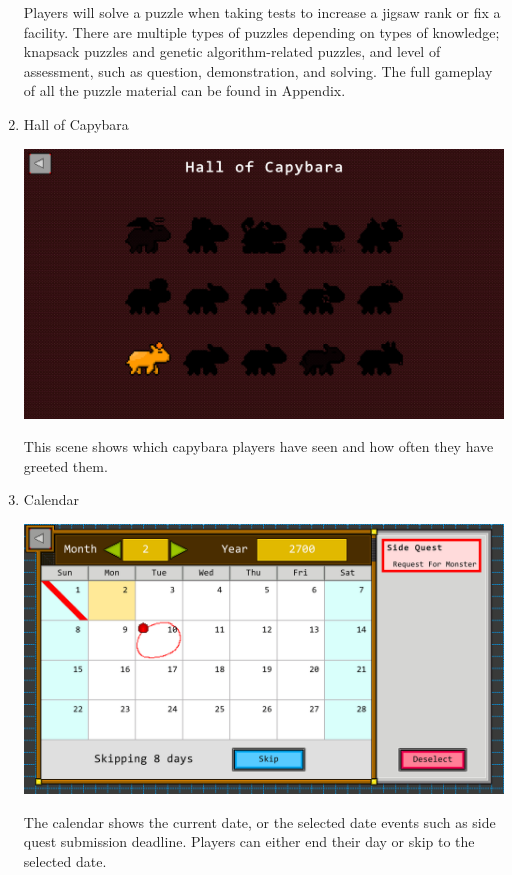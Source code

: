 \documentclass[12pt,oneside,openright,a4paper]{cpe-english-project}
\begin{document}
\begin{enumerate}
\begin{minipage}[c]{\textwidth}
	\end{minipage}
	Players will solve a puzzle when taking tests to increase a jigsaw rank or fix a facility. There are multiple types of puzzles depending on types of knowledge; knapsack puzzles and genetic algorithm-related puzzles, and level of assessment, such as question, demonstration, and solving. The full gameplay of all the puzzle material can be found in Appendix.


	\item Hall of Capybara \\
	\begin{minipage}[c]{\textwidth}\centering
	\includegraphics[width=14cm]{figure/screenshot/screenshot-HoC.png}
	\end{minipage}
	This scene shows which capybara players have seen and how often they have greeted them.

	\item Calendar \\
	\begin{minipage}[c]{\textwidth}\centering
	\includegraphics[width=14cm]{figure/screenshot/screenshot-calendar.png}
	\end{minipage}
	The calendar shows the current date, or the selected date events such as side quest submission deadline. Players can either end their day or skip to the selected date.
	

\end{enumerate}
\end{document}
